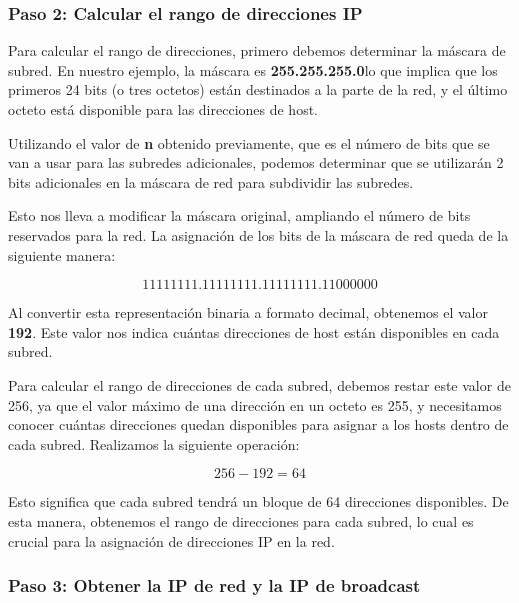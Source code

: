     \subsubsection*{Paso 2: Calcular el rango de direcciones IP}

    Para calcular el rango de direcciones, primero debemos determinar la máscara de subred. En nuestro ejemplo, la máscara es \textbf{255.255.255.0}lo que implica que los primeros 24 bits (o tres octetos) están destinados a la parte de la red, y el último octeto está disponible para las direcciones de host.

    Utilizando el valor de \textbf{n} obtenido previamente, que es el número de bits que se van a usar para las subredes adicionales, podemos determinar que se utilizarán 2 bits adicionales en la máscara de red para subdividir las subredes.
    
    Esto nos lleva a modificar la máscara original, ampliando el número de bits reservados para la red. La asignación de los bits de la máscara de red queda de la siguiente manera:
    
    \begin{equation} 
        1111 1111.1111 1111.1111 1111.1100 0000 
    \end{equation}
    
    Al convertir esta representación binaria a formato decimal, obtenemos el valor \textbf{192}. Este valor nos indica cuántas direcciones de host están disponibles en cada subred.
    
    Para calcular el rango de direcciones de cada subred, debemos restar este valor de 256, ya que el valor máximo de una dirección en un octeto es 255, y necesitamos conocer cuántas direcciones quedan disponibles para asignar a los hosts dentro de cada subred. Realizamos la siguiente operación:
    
    \begin{equation} 
        256 - 192 = 64 
    \end{equation}
    
    Esto significa que cada subred tendrá un bloque de 64 direcciones disponibles. De esta manera, obtenemos el rango de direcciones para cada subred, lo cual es crucial para la asignación de direcciones IP en la red.

    \subsubsection*{Paso 3: Obtener la IP de red y la IP de broadcast}

